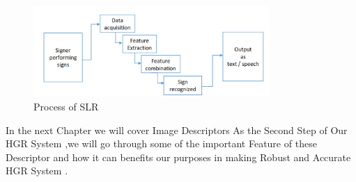 \begin{figure}[H]
\centering
\includegraphics[width=0.8\textwidth]{img/SLR.PNG}
\caption{  Process of SLR }
\label{fig:SLR}
\end{figure}

In the next Chapter we will cover Image Descriptors As the Second Step of Our HGR System ,we will go through some of the important Feature of these Descriptor and how it can benefits our purposes in making Robust and Accurate HGR System . 